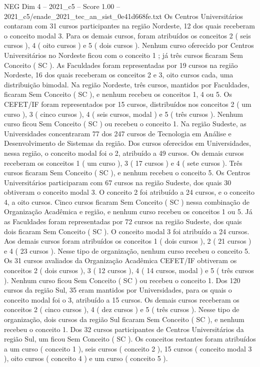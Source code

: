 \begin{textsample}{NEG Dim 4 – 2021\_c5 – Score 1.00 – 2021\_c5/enade\_2021\_tec\_an\_sist\_0e41d668fe.txt}
Os Centros Universitários contaram com 31 cursos participantes na região Nordeste, 12 dos quais receberam o conceito modal 3.
Para os demais cursos, foram atribuídos os conceitos 2 ( seis cursos ), 4 ( oito cursos ) e 5 ( dois cursos ).
Nenhum curso oferecido por Centros Universitários no Nordeste ficou com o conceito 1 ; já três cursos ficaram Sem Conceito ( SC ).
As Faculdades foram representadas por 19 cursos na região Nordeste, 16 dos quais receberam os conceitos 2 e 3, oito cursos cada, uma distribuição bimodal.
Na região Nordeste, três cursos, mantidos por Faculdades, ficaram Sem Conceito ( SC ), e nenhum recebeu os conceitos 1, 4 ou 5.
Os CEFET/IF foram representados por 15 cursos, distribuídos nos conceitos 2 ( um curso ), 3 ( cinco cursos ), 4 ( seis cursos, modal ) e 5 ( três cursos ).
Nenhum curso ficou Sem Conceito ( SC ) ou recebeu o conceito 1.
Na região Sudeste, as Universidades concentraram 77 dos 247 cursos de Tecnologia em Análise e Desenvolvimento de Sistemas da região.
Dos cursos oferecidos em Universidades, nessa região, o conceito modal foi o 2, atribuído a 49 cursos.
Os demais cursos receberam os conceitos 1 ( um curso ), 3 ( 17 cursos ) e 4 ( sete cursos ).
Três cursos ficaram Sem Conceito ( SC ), e nenhum recebeu o conceito 5.
Os Centros Universitários participaram com 67 cursos na região Sudeste, dos quais 30 obtiveram o conceito modal 3.
O conceito 2 foi atribuído a 24 cursos, e o conceito 4, a oito cursos.
Cinco cursos ficaram Sem Conceito ( SC ) nessa combinação de Organização Acadêmica e região, e nenhum curso recebeu os conceitos 1 ou 5.
Já as Faculdades foram representadas por 72 cursos na região Sudeste, dos quais dois ficaram Sem Conceito ( SC ).
O conceito modal 3 foi atribuído a 24 cursos.
Aos demais cursos foram atribuídos os conceitos 1 ( dois cursos ), 2 ( 21 cursos ) e 4 ( 23 cursos ).
Nesse tipo de organização, nenhum curso recebeu o conceito 5.
Os 31 cursos avaliados da Organização Acadêmica CEFET/IF obtiveram os conceitos 2 ( dois cursos ), 3 ( 12 cursos ), 4 ( 14 cursos, modal ) e 5 ( três cursos ).
Nenhum curso ficou Sem Conceito ( SC ) ou recebeu o conceito 1.
Dos 120 cursos da região Sul, 35 eram mantidos por Universidades, para os quais o conceito modal foi o 3, atribuído a 15 cursos.
Os demais cursos receberam os conceitos 2 ( cinco cursos ), 4 ( dez cursos ) e 5 ( três cursos ).
Nesse tipo de organização, dois cursos da região Sul ficaram Sem Conceito ( SC ), e nenhum recebeu o conceito 1.
Dos 32 cursos participantes de Centros Universitários da região Sul, um ficou Sem Conceito ( SC ).
Os conceitos restantes foram atribuídos a um curso ( conceito 1 ), seis cursos ( conceito 2 ), 15 cursos ( conceito modal 3 ), oito cursos ( conceito 4 ) e um curso ( conceito 5 ).

\end{textsample}
